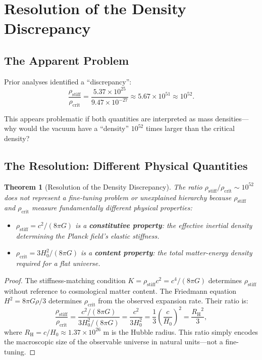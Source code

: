 \documentclass[11pt,a4paper]{article}
\newcommand{\ee}[1]{\times 10^{#1}}
\newcommand{\rhocrit}{\ensuremath{\rho_{\mathrm{crit}}}}
\newcommand{\rhostiff}{\ensuremath{\rho_{\mathrm{stiff}}}}
\newcommand{\RH}{\ensuremath{R_{\mathrm{H}}}}
\newtheorem{theorem}{Theorem}
\theoremstyle{definition}
\begin{document}
\section{Resolution of the Density Discrepancy}
\label{sec:resolution}

\subsection{The Apparent Problem}
\label{sec:apparent_problem}

Prior analyses identified a ``discrepancy'':
\begin{equation}
\label{eq:discrepancy}
\frac{\rhostiff}{\rhocrit} = \frac{5.37 \times 10^{25}}{9.47 \times 10^{-27}} \approx 5.67 \times 10^{51} \approx 10^{52}.
\end{equation}

This appears problematic if both quantities are interpreted as mass densities---why would the vacuum have a ``density'' $10^{52}$ times larger than the critical density?

\subsection{The Resolution: Different Physical Quantities}
\label{sec:resolution_main}

\begin{theorem}[Resolution of the Density Discrepancy]
\label{thm:resolution}
The ratio $\rhostiff/\rhocrit \sim 10^{52}$ does not represent a fine-tuning problem or unexplained hierarchy because $\rhostiff$ and $\rhocrit$ measure fundamentally different physical properties:
\begin{itemize}
    \item $\rhostiff = c^2/(8\pi G)$ is a \textbf{constitutive property}: the effective inertial density determining the Planck field's elastic stiffness.
    \item $\rhocrit = 3H_0^2/(8\pi G)$ is a \textbf{content property}: the total matter-energy density required for a flat universe.
\end{itemize}
\end{theorem}

\begin{proof}
The stiffness-matching condition $K = \rhostiff c^2 = c^4/(8\pi G)$ determines $\rhostiff$ without reference to cosmological matter content. The Friedmann equation $H^2 = 8\pi G \rho/3$ determines $\rhocrit$ from the observed expansion rate. Their ratio is:
\begin{equation}
\frac{\rhostiff}{\rhocrit} = \frac{c^2/(8\pi G)}{3H_0^2/(8\pi G)} = \frac{c^2}{3H_0^2} = \frac{1}{3}\left(\frac{c}{H_0}\right)^2 = \frac{\RH^2}{3},
\end{equation}
where $\RH = c/H_0 \approx 1.37 \ee{26}$ m is the Hubble radius. This ratio simply encodes the macroscopic size of the observable universe in natural units---not a fine-tuning.
\end{proof}
\end{document}
